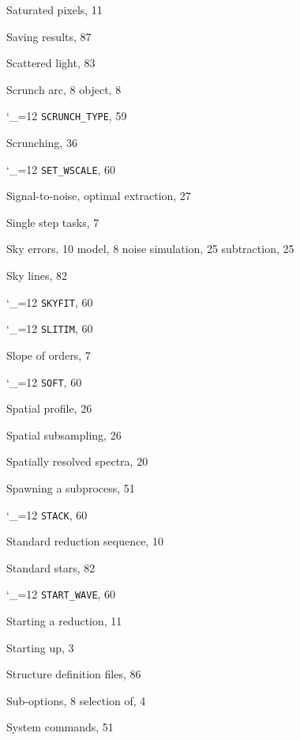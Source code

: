 \documentclass[11pt,twoside]{article}
\newcommand{\cmdname}{\begingroup \catcode`\_=12 \realcmdname}
\newcommand{\realcmdname}[1]{\endgroup\texttt{#1}}
\begin{document}
\begin{theindex}
  \item Saturated pixels, 11
  \item Saving results, 87
  \item Scattered light, 83
  \item Scrunch
    \subitem arc, 8
    \subitem object, 8
  \item \cmdname {SCRUNCH_TYPE}, 59
  \item Scrunching, 36
  \item \cmdname {SET_WSCALE}, 60
  \item Signal-to-noise, optimal extraction, 27
  \item Single step tasks, 7
  \item Sky
    \subitem errors, 10
    \subitem model, 8
    \subitem noise simulation, 25
    \subitem subtraction, 25
  \item Sky lines, 82
  \item \cmdname {SKYFIT}, 60
  \item \cmdname {SLITIM}, 60
  \item Slope of orders, 7
  \item \cmdname {SOFT}, 60
  \item Spatial profile, 26
  \item Spatial subsampling, 26
  \item Spatially resolved spectra, 20
  \item Spawning a subprocess, 51
  \item \cmdname {STACK}, 60
  \item Standard reduction
    \subitem sequence, 10
  \item Standard stars, 82
  \item \cmdname {START_WAVE}, 60
  \item Starting a reduction, 11
  \item Starting up, 3
  \item Structure definition files, 86
  \item Sub-options, 8
    \subitem selection of, 4
  \item System commands, 51

  \indexspace


\end{theindex}
\end{document}

